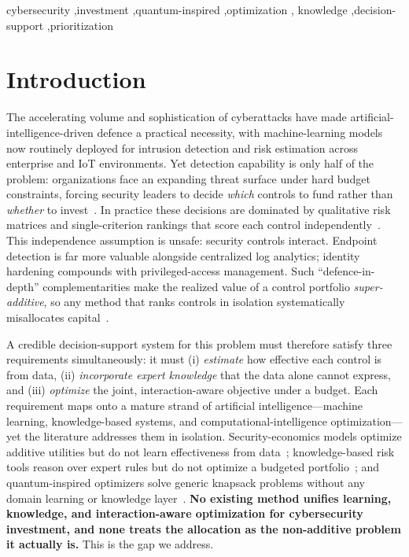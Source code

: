\documentclass[preprint,12pt]{elsarticle}
\begin{document}
\begin{frontmatter}
\begin{keyword}
cybersecurity \sep investment \sep quantum-inspired \sep optimization \sep
knowledge \sep decision-support \sep prioritization
\end{keyword}

\end{frontmatter}

\section{Introduction}
\label{sec:intro}
The accelerating volume and sophistication of cyberattacks have made
artificial-intelligence-driven defence a practical necessity, with machine-learning
models now routinely deployed for intrusion detection and risk estimation across
enterprise and IoT environments. Yet detection capability is only half of the problem:
organizations face an expanding threat surface under hard budget constraints,
forcing security leaders to decide \emph{which} controls to fund rather than
\emph{whether} to invest~\cite{gordon2002,grossklags2008}. In practice these
decisions are dominated by qualitative risk matrices and single-criterion rankings
that score each control independently~\cite{bier2007}. This independence assumption
is unsafe: security controls interact. Endpoint detection is far more valuable
alongside centralized log analytics; identity hardening compounds with
privileged-access management. Such ``defence-in-depth'' complementarities make the
realized value of a control portfolio \emph{super-additive}, so any method that ranks
controls in isolation systematically misallocates capital~\cite{bier2007,mohammadi2020}.

A credible decision-support system for this problem must therefore satisfy three
requirements simultaneously: it must (i) \emph{estimate} how effective each control is
from data, (ii) \emph{incorporate expert knowledge} that the data alone cannot
express, and (iii) \emph{optimize} the joint, interaction-aware objective under a
budget. Each requirement maps onto a mature strand of artificial intelligence---machine
learning, knowledge-based systems, and computational-intelligence optimization---yet
the literature addresses them in isolation. Security-economics models optimize additive
utilities but do not learn effectiveness from data~\cite{gordon2002,grossklags2008,bier2007};
knowledge-based risk tools reason over expert rules but do not optimize a budgeted
portfolio~\cite{mohammadi2020}; and quantum-inspired optimizers solve generic knapsack
problems without any domain learning or knowledge layer~\cite{han2002,zhang2021}.
\textbf{No existing method unifies learning, knowledge, and interaction-aware
optimization for cybersecurity investment, and none treats the allocation as the
non-additive problem it actually is.} This is the gap we address.
\end{document}
